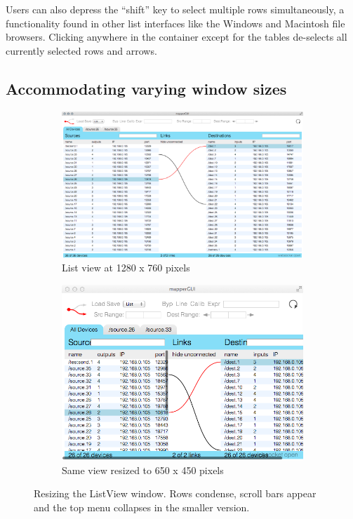 Users can also depress the ``shift'' key to select multiple rows simultaneously, a functionality found in other list interfaces like the Windows and Macintosh file browsers. Clicking anywhere in the container except for the tables de-selects all currently selected rows and arrows.
	

	\subsection{Accommodating varying window sizes} %
	\label{sec:accomodating_sizes}

\begin{figure}
	\centering
	\begin{subfigure}[]{\textwidth}
		\centering
		\includegraphics[width=\textwidth]{figures/before_resize_1280x760}
		\caption{List view at 1280 x 760 pixels}
		\label{fig:before_resize}
	\end{subfigure}
	\begin{subfigure}[]{0.5\textwidth}
		\centering
		\includegraphics[width=\textwidth]{figures/after_resize_650x450}
		\caption{Same view resized to 650 x 450 pixels}
		\label{fig:after_resize}
	\end{subfigure}
	\caption{Resizing the ListView window. Rows condense, scroll bars appear and the top menu collapses in the smaller version.}\label{fig:resizing}
\end{figure}


